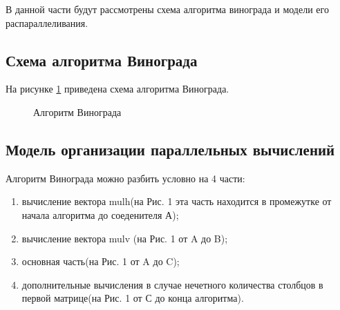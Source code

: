 \documentclass[a4paper, 14pt]{article}
\begin{document}
		В данной части будут рассмотрены схема алгоритма винограда и модели его распараллеливания. \\
        \subsection{Схема алгоритма Винограда}
        На рисунке \ref{v_s} приведена схема алгоритма Винограда.\\

    	\begin{figure}[h]
        	\caption{Алгоритм Винограда}
        	\label{v_s}
        \end{figure}
        \newpage   
        \subsection{Модель организации параллельных вычислений}
        Алгоритм Винограда можно разбить условно на 4 части: 
        \begin{enumerate}
        \item вычисление вектора mulh(на Рис. 1 эта часть находится в промежутке от начала алгоритма до соеденителя А);
        \item вычисление вектора mulv (на Рис. 1 от A до B);
        \item основная часть(на Рис. 1 от A до C);
        \item дополнительные вычисления в случае нечетного количества столбцов в первой матрице(на Рис. 1 от С до конца алгоритма).
         \end{enumerate}
               
\end{document}
